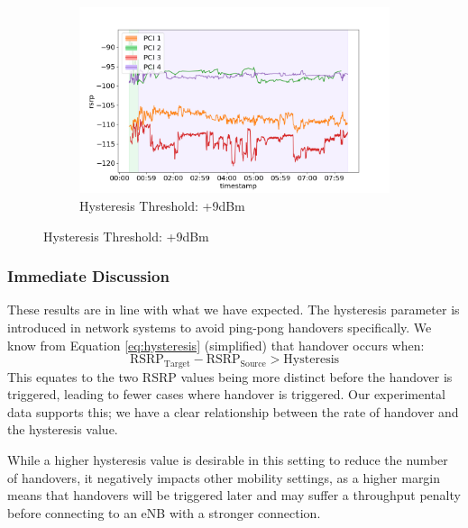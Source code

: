 \begin{figure}[p]
    \begin{subfigure}{\linewidth}
        \centering
        \includegraphics[width=0.55\linewidth]{src//img/5hyst9.png}
        \caption{Hysteresis Threshold: +9dBm}
        \label{fig:methods:hyst9}
    \end{subfigure}
\end{figure}

\subsubsection{Immediate Discussion}
These results are in line with what we have expected. The hysteresis parameter is introduced in network systems to avoid ping-pong handovers specifically. We know from Equation \ref{eq:hysteresis} (simplified) that handover occurs when:
\begin{equation*}
     \text{RSRP}_\text{Target} - \text{RSRP}_\text{Source} > \text{Hysteresis}
 \end{equation*}
 This equates to the two RSRP values being more distinct before the handover is triggered, leading to fewer cases where handover is triggered. Our experimental data supports this; we have a clear relationship between the rate of handover and the hysteresis value.

 While a higher hysteresis value is desirable in this setting to reduce the number of handovers, it negatively impacts other mobility settings, as a higher margin means that handovers will be triggered later and may suffer a throughput penalty before connecting to an eNB with a stronger connection.